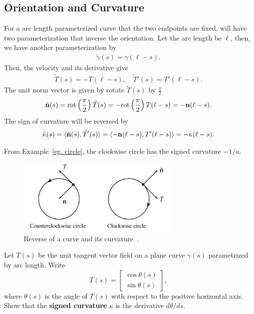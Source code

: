\subsection{Orientation and Curvature}
For a arc length parameterized curve that the two endpoints are fixed, 
will have two parameterization that inverse the orientation. Let the arc length be $\ell$,
then, we have another parameterization by
\begin{align}
    \tilde{\gamma}(s)=\gamma(\ell - s). \nonumber
\end{align}
Then, the velocity and its derivative give
\begin{align}
    \tilde{T}(s)=-T(\ell - s), \quad \tilde{T}'(s)=T'(\ell - s). \nonumber
\end{align}
The unit norm vector is given by rotate $\tilde{T}(s)$ by $\frac{\pi}{2}$
\begin{align}
    \tilde{{\mathbf{n}}}(s)=\text{rot}\left(\frac{\pi}{2}\right)\tilde{T}(s)
    =-\text{rot}\left(\frac{\pi}{2}\right)T(\ell - s)=-{\mathbf{n}}(\ell - s). \nonumber
\end{align}
The sign of curvature will be reversed by
\begin{align}
    \tilde{\kappa}(s)=\langle \tilde{{\mathbf{n}}}(s), \tilde{T}'(s) \rangle
    =\langle -{\mathbf{n}}(\ell - s), T'(\ell - s) \rangle=-\kappa(\ell-s). \nonumber
\end{align}
\begin{example}
    From Example~\ref{eg. circle}, the clockwise circle has the signed curvature $-1/a$.
\end{example}
\begin{figure}[htb]
    \centering
    \includegraphics[width=0.7\textwidth]{../Lectures/Figures/reverse_orient.png}
    \caption{Reverse of a curve and its curvature~\cite[p.~13]{tu2010introduction}.}
\end{figure}
\begin{problem}
    Let $T(s)$ be the unit tangent vector field on a plane curve $\gamma(s)$ parametrized 
    by arc length. Write
\[
T(s) = \begin{bmatrix}
        \cos \theta(s) \\ 
        \sin \theta(s) 
        \end{bmatrix},
\]
where $\theta(s)$ is the angle of $T(s)$ with respect to the positive horizontal axis. 
Show that the \textbf{signed curvature} $\kappa$ is the derivative $d\theta/ds$.
\label{problem. 2.1}
\end{problem}

